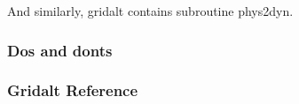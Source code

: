 \noindent And similarly, gridalt contains subroutine phys2dyn.

\subsubsection {Dos and donts}

\subsubsection {Gridalt Reference} 
